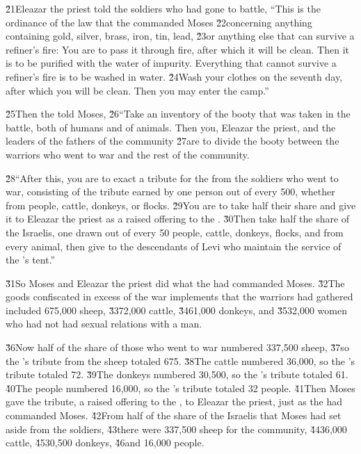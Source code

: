 \v{21}Eleazar the priest told the soldiers who had gone to battle, ``This is the ordinance of the law that the  commanded Moses \v{22}concerning anything containing gold, silver, brass, iron, tin, lead, \v{23}or anything else that can survive a refiner's fire: You are to pass it through fire, after which it will be clean. Then it is to be purified with the water of impurity. Everything that cannot survive a refiner's fire is to be washed in water. \v{24}Wash your clothes on the seventh day, after which you will be clean. Then you may enter the camp.''

\v{25}Then the  told Moses, \v{26}``Take an inventory of the booty that was taken in the battle, both of humans and of animals. Then you, Eleazar the priest, and the leaders of the fathers of the community \v{27}are to divide the booty between the warriors who went to war and the rest of the community.

\v{28}``After this, you are to exact a tribute for the  from the soldiers who went to war, consisting of the tribute earned by one person out of every 500, whether from people, cattle, donkeys, or flocks. \v{29}You are to take half their share and give it to Eleazar the priest as a raised offering to the . \v{30}Then take half the share of the Israelis, one drawn out of every 50 people, cattle, donkeys, flocks, and from every animal, then give to the descendants of Levi who maintain the service of the 's tent.''

\v{31}So Moses and Eleazar the priest did what the  had commanded Moses. \v{32}The goods confiscated in excess of the war implements that the warriors had gathered included 675,000 sheep, \v{33}72,000 cattle, \v{34}61,000 donkeys, and \v{35}32,000 women who had not had sexual relations with a man.

\v{36}Now half of the share of those who went to war numbered 337,500 sheep, \v{37}so the 's tribute from the sheep totaled 675. \v{38}The cattle numbered 36,000, so the 's tribute totaled 72. \v{39}The donkeys numbered 30,500, so the 's tribute totaled 61. \v{40}The people numbered 16,000, so the 's tribute totaled 32 people. \v{41}Then Moses gave the tribute, a raised offering to the , to Eleazar the priest, just as the  had commanded Moses. \v{42}From half of the share of the Israelis that Moses had set aside from the soldiers, \v{43}there were 337,500 sheep for the community, \v{44}36,000 cattle, \v{45}30,500 donkeys, \v{46}and 16,000 people.

